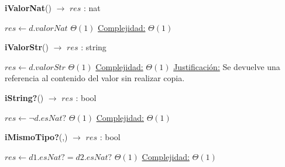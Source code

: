   
\begin{algorithm}[H]{\textbf{iValorNat}() $\to$ $res$ : nat}
    	\begin{algorithmic}[1]
			 \State $res \gets d.valorNat $ \Comment $\Theta(1)$
			\medskip
			\Statex \underline{Complejidad:} $\Theta(1)$
    	\end{algorithmic}
\end{algorithm}


\begin{algorithm}[H]{\textbf{iValorStr}() $\to$ $res$ : string}
    	\begin{algorithmic}[1]
			 \State $res \gets d.valorStr $ \Comment $\Theta(1)$
			\medskip
			\Statex \underline{Complejidad:} $\Theta(1)$
			\Statex \underline{Justificación:} Se devuelve una referencia al contenido del valor sin realizar copia.
    	\end{algorithmic}
\end{algorithm}


\begin{algorithm}[H]{\textbf{iString?}() $\to$ $res$ : bool}
    	\begin{algorithmic}[1]
			 \State $res \gets \lnot d.esNat? $ \Comment $\Theta(1)$
			\medskip
			\Statex \underline{Complejidad:} $\Theta(1)$
    	\end{algorithmic}
\end{algorithm}


\begin{algorithm}[H]{\textbf{iMismoTipo?}(,) $\to$ $res$ : bool}
    	\begin{algorithmic}[1]
			 \State $res \gets d1.esNat? = d2.esNat?  $ \Comment $\Theta(1)$
			\medskip
			\Statex \underline{Complejidad:} $\Theta(1)$
    	\end{algorithmic}
\end{algorithm}



		


